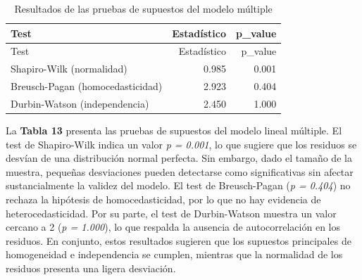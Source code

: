 \documentclass[
  spanish,
  11pt,
  a4paper,
  DIV=11,
  numbers=noendperiod]{scrartcl}
\begin{document}
\begin{longtable}[]{@{}lrr@{}}
\caption{Resultados de las pruebas de supuestos del modelo
múltiple}\tabularnewline
\toprule\noalign{}
Test & Estadístico & p\_value \\
\midrule\noalign{}
\endfirsthead
\toprule\noalign{}
Test & Estadístico & p\_value \\
\midrule\noalign{}
\endhead
\bottomrule\noalign{}
\endlastfoot
Shapiro-Wilk (normalidad) & 0.985 & 0.001 \\
Breusch-Pagan (homocedasticidad) & 2.923 & 0.404 \\
Durbin-Watson (independencia) & 2.450 & 1.000 \\
\end{longtable}

La \textbf{Tabla 13} presenta las pruebas de supuestos del modelo lineal
múltiple. El test de Shapiro-Wilk indica un valor \emph{p = 0.001}, lo
que sugiere que los residuos se desvían de una distribución normal
perfecta. Sin embargo, dado el tamaño de la muestra, pequeñas
desviaciones pueden detectarse como significativas sin afectar
sustancialmente la validez del modelo. El test de Breusch-Pagan (\emph{p
= 0.404}) no rechaza la hipótesis de homocedasticidad, por lo que no hay
evidencia de heterocedasticidad. Por su parte, el test de Durbin-Watson
muestra un valor cercano a 2 (\emph{p = 1.000}), lo que respalda la
ausencia de autocorrelación en los residuos. En conjunto, estos
resultados sugieren que los supuestos principales de homogeneidad e
independencia se cumplen, mientras que la normalidad de los residuos
presenta una ligera desviación.
\end{document}
